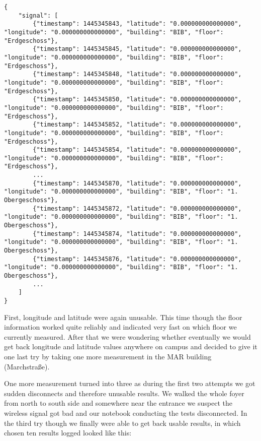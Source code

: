 \begin{lstlisting}
{
    "signal": [
        {"timestamp": 1445345843, "latitude": "0.000000000000000", "longitude": "0.000000000000000", "building": "BIB", "floor": "Erdgeschoss"},
        {"timestamp": 1445345845, "latitude": "0.000000000000000", "longitude": "0.000000000000000", "building": "BIB", "floor": "Erdgeschoss"},
        {"timestamp": 1445345848, "latitude": "0.000000000000000", "longitude": "0.000000000000000", "building": "BIB", "floor": "Erdgeschoss"},
        {"timestamp": 1445345850, "latitude": "0.000000000000000", "longitude": "0.000000000000000", "building": "BIB", "floor": "Erdgeschoss"},
        {"timestamp": 1445345852, "latitude": "0.000000000000000", "longitude": "0.000000000000000", "building": "BIB", "floor": "Erdgeschoss"},
        {"timestamp": 1445345854, "latitude": "0.000000000000000", "longitude": "0.000000000000000", "building": "BIB", "floor": "Erdgeschoss"},
        ...
        {"timestamp": 1445345870, "latitude": "0.000000000000000", "longitude": "0.000000000000000", "building": "BIB", "floor": "1. Obergeschoss"},
        {"timestamp": 1445345872, "latitude": "0.000000000000000", "longitude": "0.000000000000000", "building": "BIB", "floor": "1. Obergeschoss"},
        {"timestamp": 1445345874, "latitude": "0.000000000000000", "longitude": "0.000000000000000", "building": "BIB", "floor": "1. Obergeschoss"},
        {"timestamp": 1445345876, "latitude": "0.000000000000000", "longitude": "0.000000000000000", "building": "BIB", "floor": "1. Obergeschoss"},
        ...
    ]
}
\end{lstlisting}

First, longitude and latitude were again unusable. This time though the floor information worked quite reliably and indicated very fast on which floor we currently measured. After that we were wondering whether eventually we would get back longitude and latitude values anywhere on campus and decided to give it one last try by taking one more measurement in the MAR building (Marchstraße).

One more measurement turned into three as during the first two attempts we got sudden disconnects and therefore unusable results. We walked the whole foyer from north to south side and somewhere near the entrance we suspect the wireless signal got bad and our notebook conducting the tests disconnected. In the third try though we finally were able to get back usable results, in which chosen ten results logged looked like this:


